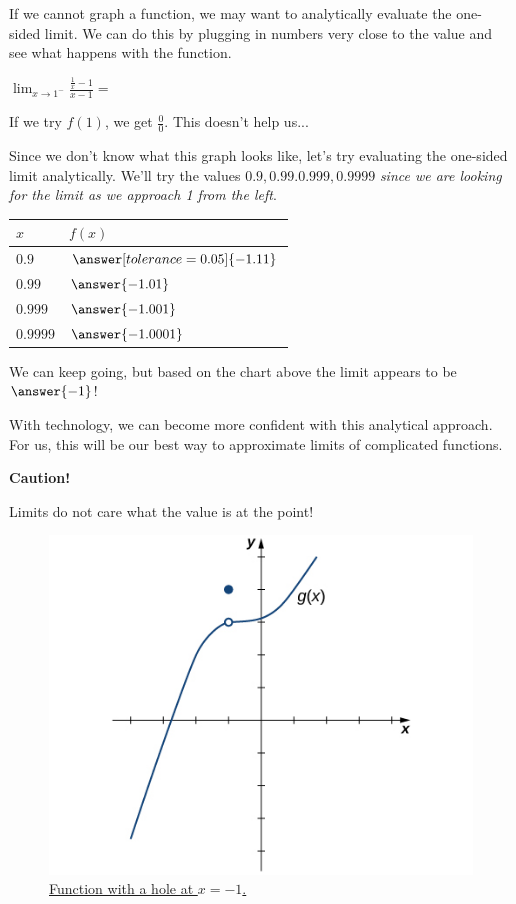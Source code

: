 \documentclass{ximera}
\begin{document}
If we cannot graph a function, we may want to analytically evaluate the one-sided limit. We can do this by plugging in numbers very close to the value and see what happens with the function. 

\begin{example}
$\lim_{x \rightarrow 1^{-}} \frac{\frac{1}{x} - 1}{x - 1} = $

If we try $f(1)$, we get $\frac{0}{0}$. This doesn't help us...

Since we don't know what this graph looks like, let's try evaluating the one-sided limit analytically. We'll try the values $0.9, 0.99. 0.999, 0.9999$ \textit{since we are looking for the limit as we approach 1 from the left}.

\begin{tabular}{l|l}
	$x$ & $f(x)$ \\
	\hline 
	$0.9$ & $\answer[tolerance=0.05]{-1.11}$\\ 
	$0.99$ & $\answer{-1.01}$\\
	$0.999$ & $\answer{-1.001}$\\
	$0.9999$ & $\answer{-1.0001}$
\end{tabular}

We can keep going, but based on the chart above the limit appears to be $\answer{-1}$!

\end{example}

With technology, we can become more confident with this analytical approach. For us, this will be our best way to approximate limits of complicated functions. 

\begin{center} \textbf{Caution!} \end{center}

Limits do not care what the value is at the point!

\begin{figure}
	\includegraphics{CNX_Calc_Figure_02_02_006.jpg}
	\caption{\href{https://cnx.org/contents/i4nRcikn@5.1:dKCfyV9u@5/The-Limit-of-a-Function\#CNX_Calc_Figure_02_02_006}{Function with a hole at $x=-1$.}}
\end{figure}
\end{document}

